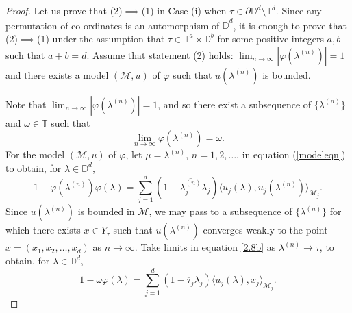 \documentclass[11pt, reqno]{amsart}
\newcommand\1{\boldsymbol {1}}
\newcommand{\M}{\mathcal{M}}
\newcommand{\T}{\mathbb{T}}
\newcommand{\D}{\mathbb{D}}
\newcommand{\ph}{\varphi}
\newcommand\la{\lambda}
\numberwithin{equation}{section}
\begin{document}
\begin{proof}
Let us prove that (2)$\implies$(1) in Case (i) when $\tau\in\partial\mathbb{D}^{d}\setminus\mathbb{T}^{d}$. Since any permutation of co-ordinates is an automorphism of $\overline{\mathbb{D}}^{d}$, it is enough to prove that (2)$\implies$(1) under the assumption that $\tau\in\mathbb{T}^{a}\times \mathbb{D}^{b}$ for some positive integers $a,b$ such that $a+b=d$.
Assume that statement (2) holds:
 $ \lim_{n \to \infty} |\varphi(\lambda^{(n)})| =1$ and  there exists  a  model $(\mathcal{M},u)$ of  $ \varphi$   such  that $u(\lambda^{(n)})$ is  bounded.

Note that $ \lim_{n \to \infty} |\varphi(\lambda^{(n)})| =1$, and so there exist a subsequence of $\{\lambda^{(n)}\}$ and $\omega\in\T$  such that 
\[
 \lim_{n\to\infty} \ph(\lambda^{(n)}) =\omega.
\]
For the model $(\mathcal{M},u)$ of $\varphi$, let $\mu=\lambda^{(n)}$, $n= 1,2, \dots$, in equation (\ref{modeleqn}) to obtain, for $\la\in\D^d$, 
\begin{equation} \label{2.8b}
1 - \overline{\varphi(\lambda^{(n)})} \varphi(\lambda) = \sum_{j=1}^{d}(1-\overline{\lambda^{(n)}_{j}}\lambda_{j})
\langle u_{j}(\lambda),u_{j}( \lambda^{(n)})  \rangle_{\mathcal{M}_{j}}.
\end{equation} 
Since  $u(\lambda^{(n)})$ is  bounded in $\M$, we may pass to a subsequence of $\{\lambda^{(n)}\}$ for which there exists $x\in Y_\tau$ such that $u(\lambda^{(n)})$ converges weakly to the point $x=(x_1, x_2, \dots, x_d)$ as $ n \to \infty$.
Take limits in equation \eqref{2.8b} as $\lambda^{(n)} \rightarrow \tau$, to obtain, for $\la\in\D^d$,
\begin{equation}\label{2.8c}
1-\overline{\omega}\varphi(\lambda)=\sum_{j=1}^{d}(1-\overline{\tau}_{j}\lambda_{j})\langle u_{j}(\lambda),x_{j}\rangle_{\mathcal{M}_{j}}.
\end{equation}


\end{proof}
\end{document}
